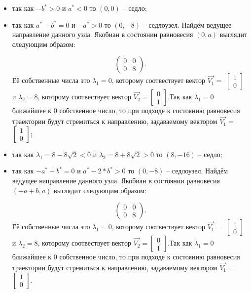 \begin{itemize}
	\item{ так как $-b^\ast > 0 $ и $a^\ast  < 0 $ то $(0, 0)$ -- седло;}
	\item{ так как $a^\ast - b^\ast = 0 $ и $-a^\ast > 0 $ то $(0, -8)$ -- седлоузел. Найдём ведущее направление данного узла. Якобиан в состоянии равновесия $(0, a)$ выглядит следующим образом:
		
		$$\begin{pmatrix}0 & 0\\0 & 8\end{pmatrix}. $$Её собственные числа это $\lambda_1=0$, которому соотвествует вектор $\Vec{V_1}=$ $\left[\begin{matrix}1\\0\end{matrix}\right]$ и $\lambda_2=8$, которому соотвествует вектор $\Vec{V_2}=$$\left[\begin{matrix}0\\1\end{matrix}\right]$.Так как $\lambda_1=0$ ближайшее к $0$ собственное число, то при подходе к состоянию равновесия траектории будут стремиться к направлению, задаваемому вектором $\Vec{V_1}=$ $\left[\begin{matrix}1\\0\end{matrix}\right]$;}
	\item{ так как ${\lambda_{1}} = 8 - 8 \sqrt{2}$$  < 0 $ и ${\lambda_{2}} = 8 + 8 \sqrt{2}$$ > 0 $ то $(8, -16)$ -- седло;}
	\item{ так как $-a^\ast + b^\ast = 0 $ и $a^\ast - 2*b^\ast > 0 $ то $(0, -8)$ -- седлоузел. Найдём ведущее направление данного узла. Якобиан в состоянии равновесия $(-a + b, a)$ выглядит следующим образом:
		
		$$\begin{pmatrix}0 & 0\\0 & 8\end{pmatrix}. $$Её собственные числа это $\lambda_1=0$, которому соотвествует вектор $\Vec{V_1}=$ $\left[\begin{matrix}1\\0\end{matrix}\right]$ и $\lambda_2=8$, которому соотвествует вектор $\Vec{V_2}=$$\left[\begin{matrix}0\\1\end{matrix}\right]$.Так как $\lambda_1=0$ ближайшее к $0$ собственное число, то при подходе к состоянию равновесия траектории будут стремиться к направлению, задаваемому вектором $\Vec{V_1}=$ $\left[\begin{matrix}1\\0\end{matrix}\right]$.}
\end{itemize} 

